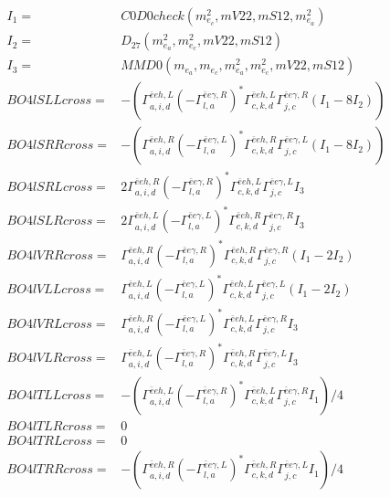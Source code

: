 \documentclass[A4,landscape]{article}
\begin{document}
\begin{align} 
I_1 = & C0D0check(m^2_{e_{{c}}}, mV22, mS12, m^2_{e_{{a}}}) \\ 
I_2 = & D_{27}(m^2_{e_{{a}}}, m^2_{e_{{c}}}, mV22, mS12) \\ 
I_3 = & MMD0(m_{e_{{a}}}, m_{e_{{c}}}, m^2_{e_{{a}}}, m^2_{e_{{c}}}, mV22, mS12) \\ 
  BO4lSLLcross= & -( \Gamma^{\bar{e}e h ,L}_{a, i, d} (- \Gamma^{\bar{e}e \gamma ,R} _{l, a})^* \Gamma^{\bar{e}e h ,L}_{c, k, d} \Gamma^{\bar{e}e \gamma ,R}_{j, c} (I_1 - 8 I_2)) \\ 
  BO4lSRRcross= & -( \Gamma^{\bar{e}e h ,R}_{a, i, d} (- \Gamma^{\bar{e}e \gamma ,L} _{l, a})^* \Gamma^{\bar{e}e h ,R}_{c, k, d} \Gamma^{\bar{e}e \gamma ,L}_{j, c} (I_1 - 8 I_2)) \\ 
  BO4lSRLcross= & 2  \Gamma^{\bar{e}e h ,R}_{a, i, d} (- \Gamma^{\bar{e}e \gamma ,R} _{l, a})^* \Gamma^{\bar{e}e h ,L}_{c, k, d} \Gamma^{\bar{e}e \gamma ,L}_{j, c} I_3 \\ 
  BO4lSLRcross= & 2  \Gamma^{\bar{e}e h ,L}_{a, i, d} (- \Gamma^{\bar{e}e \gamma ,L} _{l, a})^* \Gamma^{\bar{e}e h ,R}_{c, k, d} \Gamma^{\bar{e}e \gamma ,R}_{j, c} I_3 \\ 
  BO4lVRRcross= &  \Gamma^{\bar{e}e h ,R}_{a, i, d} (- \Gamma^{\bar{e}e \gamma ,R} _{l, a})^* \Gamma^{\bar{e}e h ,R}_{c, k, d} \Gamma^{\bar{e}e \gamma ,R}_{j, c} (I_1 - 2 I_2) \\ 
  BO4lVLLcross= &  \Gamma^{\bar{e}e h ,L}_{a, i, d} (- \Gamma^{\bar{e}e \gamma ,L} _{l, a})^* \Gamma^{\bar{e}e h ,L}_{c, k, d} \Gamma^{\bar{e}e \gamma ,L}_{j, c} (I_1 - 2 I_2) \\ 
  BO4lVRLcross= &  \Gamma^{\bar{e}e h ,R}_{a, i, d} (- \Gamma^{\bar{e}e \gamma ,L} _{l, a})^* \Gamma^{\bar{e}e h ,L}_{c, k, d} \Gamma^{\bar{e}e \gamma ,R}_{j, c} I_3 \\ 
  BO4lVLRcross= &  \Gamma^{\bar{e}e h ,L}_{a, i, d} (- \Gamma^{\bar{e}e \gamma ,R} _{l, a})^* \Gamma^{\bar{e}e h ,R}_{c, k, d} \Gamma^{\bar{e}e \gamma ,L}_{j, c} I_3 \\ 
  BO4lTLLcross= & -( \Gamma^{\bar{e}e h ,L}_{a, i, d} (- \Gamma^{\bar{e}e \gamma ,R} _{l, a})^* \Gamma^{\bar{e}e h ,L}_{c, k, d} \Gamma^{\bar{e}e \gamma ,R}_{j, c} I_1)/4 \\ 
  BO4lTLRcross= & 0 \\ 
  BO4lTRLcross= & 0 \\ 
  BO4lTRRcross= & -( \Gamma^{\bar{e}e h ,R}_{a, i, d} (- \Gamma^{\bar{e}e \gamma ,L} _{l, a})^* \Gamma^{\bar{e}e h ,R}_{c, k, d} \Gamma^{\bar{e}e \gamma ,L}_{j, c} I_1)/4 \\ 
\end{align} 
\end{document}
